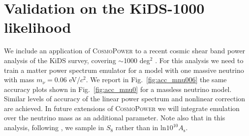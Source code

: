 \documentclass[fleqn,usenatbib]{mnras}
\begin{document}
\section{Validation on the KiDS-1000 likelihood}
\label{app:kids1000}
We include an application of \textsc{CosmoPower} to a recent cosmic shear band power analysis of the KiDS survey, covering $\sim$1000 deg$^2$ \citep[KiDS-1000,][]{Asgari20}. For this analysis we need to train a matter power spectrum emulator for a model with one massive neutrino with mass $m_{\nu}=0.06$ eV/$c^2$. We report in Fig.~\ref{fig:acc_mnu006} the same accuracy plots shown in Fig.~\ref{fig:acc_mnu0} for a massless neutrino model. Similar levels of accuracy of the linear power spectrum and nonlinear correction are achieved. In future extensions of \textsc{CosmoPower} we will integrate emulation over the neutrino mass as an additional parameter. Note also that in this analysis, following \citet{Asgari20}, we sample in $S_8$ rather than in $\mathrm{ln} 10^{10}A_{\mathrm{s}}$. 
\end{document}
